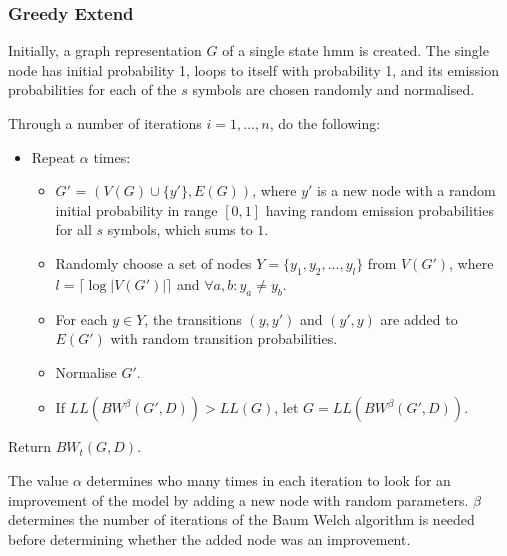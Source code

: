 \subsubsection{Greedy Extend}
Initially, a graph representation $G$ of a single state \gls{hmm} is created. The single node has initial probability 1, loops to itself with probability 1, and its emission probabilities for each of the $s$ symbols are chosen randomly and normalised.

Through a number of iterations $i = 1, ..., n$, do the following:
\begin{itemize}
\item Repeat $\alpha$ times:
	\begin{itemize}
	\item $G'$ = $(V(G) \cup \{y'\}, E(G))$, where $y'$ is a new node with a random initial probability in range $[0, 1]$ having random emission probabilities for all $s$ symbols, which sums to $1$.
	\item Randomly choose a set of nodes $Y = \{y_1, y_2, ... , y_l\}$ from $V(G')$, where $l = \lceil \log |V(G')| \rceil$ and $\forall a,b: y_a \neq y_b$.
	\item For each $y \in Y$, the transitions $(y, y')$ and $(y', y)$ are added to $E(G')$ with random transition probabilities.
	\item Normalise $G'$.
	\item If $LL(BW^{\beta}(G', D)) > LL(G)$, let $G = LL(BW^{\beta}(G', D))$.
	\end{itemize}
\end{itemize}

Return $BW_t(G, D)$.

The value $\alpha$ determines who many times in each iteration to look for an improvement of the model by adding a new node with random parameters.
$\beta$ determines the number of iterations of the Baum Welch algorithm is needed before determining whether the added node was an improvement.